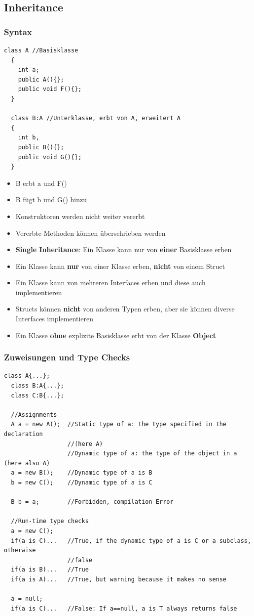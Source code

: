 \subsection{Inheritance}
\subsubsection{Syntax}
\begin{lstlisting}[style=C]
  class A //Basisklasse
  {
    int a; 
    public A(){};
    public void F(){};
  }
  
  class B:A //Unterklasse, erbt von A, erweitert A
  {
    int b, 
    public B(){};
    public void G(){};
  }
\end{lstlisting}
\begin{itemize}
  \item B erbt a und F()
  \item B fügt b und G() hinzu
  \item Konstruktoren werden nicht weiter vererbt
  \item Vererbte Methoden können überschrieben werden
  \item \textbf{Single Inheritance}: Ein Klasse kann nur von \textbf{einer}
  Basisklasse erben 
  \item Ein Klasse kann \textbf{nur} von einer Klasse erben, \textbf{nicht} von
  einem Struct
  \item Ein Klasse kann von mehreren Interfaces erben und diese auch
  implementieren
  \item Structs können \textbf{nicht} von anderen Typen erben, aber sie können
  diverse Interfaces implementieren
  \item Ein Klasse \textbf{ohne} explizite Basisklasse erbt von der Klasse
  \textbf{Object}
\end{itemize}
 
\subsubsection{Zuweisungen und Type Checks}
\begin{lstlisting}[style=C]
  class A{...};
  class B:A{...};
  class C:B{...};
  
  //Assignments
  A a = new A();  //Static type of a: the type specified in the declaration
                  //(here A)
                  //Dynamic type of a: the type of the object in a (here also A)
  a = new B();    //Dynamic type of a is B
  b = new C();    //Dynamic type of a is C
  
  B b = a;        //Forbidden, compilation Error
  
  //Run-time type checks
  a = new C(); 
  if(a is C)...   //True, if the dynamic type of a is C or a subclass, otherwise
                  //false
  if(a is B)...   //True
  if(a is A)...   //True, but warning because it makes no sense
  
  a = null; 
  if(a is C)...   //False: If a==null, a is T always returns false
\end{lstlisting}


